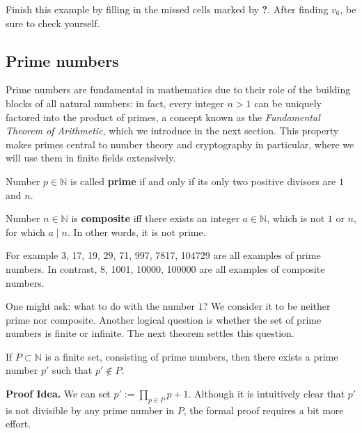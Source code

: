 \documentclass[../lecture-notes-148x210.tex]{subfiles}
\begin{document}
\begin{exercise}
    Finish this example by filling in the missed cells marked by
    \textcolor{green!60!black}{\textbf{?}}. After finding $v_6$, be sure to
    check yourself.
\end{exercise}

\subsection{Prime numbers}

Prime numbers are fundamental in mathematics due to their role of the building
blocks of all natural numbers: in fact, every integer $n>1$ can be uniquely
factored into the product of primes, a concept known as the \emph{Fundamental
Theorem of Arithmetic}, which we introduce in the next section. This property
makes primes central to number theory and cryptography in particular, where 
we will use them in finite fields extensively.

\begin{definition}
    Number $p \in \mathbb{N}$ is called \textbf{prime} if and only if its only
    two positive divisors are $1$ and $n$. 
\end{definition}

\begin{definition}
    Number $n \in \mathbb{N}$ is \textbf{composite} iff there exists an integer
    $a \in \mathbb{N}$, which is not $1$ or $n$, for which $a \mid n$. In other words,
    it is not prime.
\end{definition}

\begin{example}
    For example 3, 17, 19, 29, 71, 997, 7817, 104729 are all examples of prime numbers.
    In contrast, 8, 1001, 10000, 100000 are all examples of composite numbers.
\end{example}

One might ask: what to do with the number $1$? We consider it to be neither prime 
nor composite. Another logical question is whether the set of prime numbers is finite or infinite.
The next theorem settles this question.

\begin{theorem} 
    If $P \subset \mathbb{N}$ is a finite set, consisting of prime numbers, then
    there exists a prime number $p'$ such that $p' \notin P$.
\end{theorem}

\textbf{Proof Idea.} We can set $p' := \prod_{p \in P}p + 1$. Although it is 
intuitively clear that $p'$ is not divisible by any prime number in $P$, the
formal proof requires a bit more effort.
\end{document}
